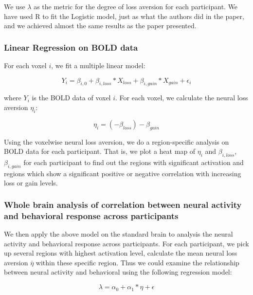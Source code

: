 We use $\lambda$ as the metric for the degree of loss aversion for each 
participant. We have used R to fit the Logistic model, just as what the 
authors did in the paper, and we achieved almost the same results as the paper 
presented.

\subsubsection{Linear Regression on BOLD data}

For each voxel $i$, we fit a multiple linear model:

\begin{equation}
Y_{i} = \beta_{i, 0} + \beta_{i, loss} *X_{loss} + \beta_{i, gain} * X_{gain}  + 
\epsilon_i
\end{equation}

where $Y_{i}$ is the BOLD data of voxel $i$. For each voxel, we calculate the 
neural loss aversion $\eta_i$:

\begin{equation}
\eta_i = (-\beta_{loss}) - \beta_{gain}
\end{equation}

Using the voxelwise neural loss aversion, we do a region-specific analysis on 
BOLD data for each participant. That is, we plot a heat map of $\eta_i$ and  
$\beta_{i, loss}$, $ \beta_{i, gain}$ for each participant to find out the 
regions with significant activation and regions which show a significant 
positive or negative correlation with increasing loss or gain levels.

\subsubsection{Whole brain analysis of correlation between 
neural activity and behavioral response across participants}

We then apply the above model on the standard brain to analysis the neural 
activity and behavioral response across participants. For each participant, 
we pick up several regions with highest activation level, calculate the mean 
neural loss aversion $\bar{\eta}$ within these specific region. Thus we could 
examine the relationship between neural activity and behavioral using the 
following regression model:

\begin{equation}
\lambda = \alpha_0 + \alpha_1 * \eta + \epsilon
\end{equation}

